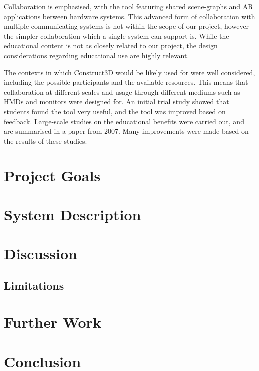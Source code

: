 Collaboration is emphasised, with the tool featuring shared scene-graphs and AR applications between hardware systems. This advanced form of collaboration with multiple communicating systems is not within the scope of our project, however the simpler collaboration which a single system can support is. While the educational content is not as closely related to our project, the design considerations regarding educational use are highly relevant.

The contexts in which Construct3D would be likely used for were well considered, including the possible participants and the available resources. This means that collaboration at different scales and usage through different mediums such as HMDs and monitors were designed for. An initial trial study showed that students found the tool very useful, and the tool was improved based on feedback. Large-scale studies on the educational benefits were carried out, and are summarised in a paper from 2007\cite{Kaufmann07}. Many improvements were made based on the results of these studies.


\section{Project Goals}

\section{System Description}

\section{Discussion}

\subsection{Limitations}

\section{Further Work}

\section{Conclusion}

